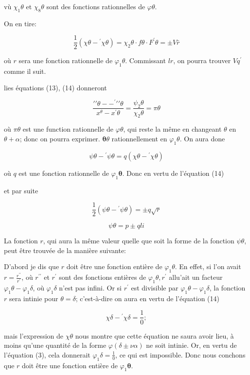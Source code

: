 \documentclass{article}
\begin{document}
vù \(\chi_{1} \theta\) et \(\chi_{8} \theta\) sont des fonctions rationnelles de \(\varphi \theta\).

On en tire:

\[
\frac{1}{2}\left(\chi \theta-{ }^{\prime} \chi \theta\right)=\chi_{2} \theta \cdot f \theta \cdot F^{\prime} \theta= \pm V \bar{r}
\]

où \(r\) sera une fonction rationnelle de \(\varphi_{1} \theta\). Commissant \(l r\), on pourra trouver \(V q^{\prime}\) comme il suit.

lies équations (13), (14) donneront

\[
\frac{\prime \prime \theta--^{\prime} \prime \prime \theta}{x^{\theta}-x^{\prime} \theta}=\frac{\psi_{2} \theta}{\chi_{2} \theta}=\pi \theta
\]

où \(\pi \theta\) est une function rationnelle de \(\varphi \theta\), qui reste la même en changeant \(\theta\) en \(\theta+\alpha\); donc on pourra exprimer. \(\boldsymbol{\theta} \theta\) rationnellement en \(\varphi_{1} \theta\). On aura done

\[
\psi \theta-{ }^{\prime} \psi \theta=q\left(\chi \theta-{ }^{\prime} \chi \theta\right)
\]

où \(q\) est une fonction rationnelle de \(\varphi_{1} \boldsymbol{\theta}\). Donc en vertu de l'équation (14)

et par suite

\[
\frac{1}{2}\left(\psi \theta-{ }^{\prime} \psi \theta\right)= \pm q \sqrt{r}
\]

\[
\psi \theta=p \pm q l i
\]

La fonction \(r\), qui aura la même valeur quelle que soit la forme de la fonction \(\psi \theta\), peut être trouvée de la manière suivante:

D'abord je dis que \(r\) doit être une fonction entière de \(\varphi_{1} \theta\). En effet, si l'on avait \(r=\frac{r^{\prime \prime}}{r^{\prime}}\), où \(r^{\prime \prime}\) et \(r^{\prime}\) sont des fonctions entières de \(\varphi_{1} \theta, r^{\prime}\) allu'ait
un facteur \(\varphi_{1} \theta-\varphi_{1} \delta\), où \(\varphi_{1} \delta\) n'est pas infini. Or si \(r^{\prime}\) est divisible par \(\varphi_{1} \theta-\varphi_{1} \delta\), la fonction \(r\) sera intinie pour \(\theta=\delta\); c'est-à-dire on aura en vertu de l'équation (14)

\[
\chi \delta-{ }^{\prime} \chi \delta=\frac{1}{0} ;
\]

mais l'expression de \(\chi \theta\) nous montre que cette équation ne saura avoir lieu, à moins qu'une quantité de la forme \(\varphi(\delta \pm \nu \alpha)\) ne soit intinie. Or, en vertu de l'équation (3), cela donnerait \(\varphi_{1} \delta=\frac{1}{0}\), ce qui est impossible. Donc nous conchons que \(r\) doit être une fonction entière de \(\varphi_{1} \boldsymbol{\theta}\).
\end{document}
